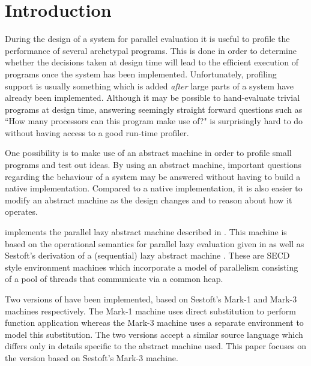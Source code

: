 \documentclass{llncs}
\begin{document}
\newcommand\blocked		{$\Box$}
\newcommand\blackhole		{$\bullet$}
\newcommand\blockedon[1]	{$\bullet \, _{#1}$}
\newcommand\bind		{$\rightarrow \:$}
\newcommand\px			{p$_x$}



\section{Introduction}
During the design of a system for parallel evaluation it is useful to profile the performance of several archetypal programs. This is done in order to determine whether the decisions taken at design time will lead to the  efficient execution of programs once the system has been implemented. Unfortunately, profiling support is usually something which is added \emph{after} large parts of a system have already been implemented. Although it may be possible to hand-evaluate trivial programs at design time, answering seemingly straight forward questions such as ``How many processors can this program make use of?" is surprisingly hard to do without having access to a good run-time profiler. \cite{loidl:thesis}

One possibility is to make use of an abstract machine in order to profile small programs and test out ideas. By using an abstract machine, important questions regarding the behaviour of a system may be answered without having to build a native implementation. Compared to a native implementation, it is also easier to modify an abstract machine as the design changes and to reason about how it operates.

\ample implements the parallel lazy abstract machine described in \cite{baker-finch:sfp99}. This machine is based on the operational semantics for parallel lazy evaluation given in \cite{baker-finch+king+trinder:icfp2000} as well as Sestoft's derivation of a (sequential) lazy abstract machine \cite{sestoft:abstractmachine}. These are SECD style environment machines which incorporate a model of parallelism consisting of a pool of threads that communicate via a common heap.

Two versions of \ample have been implemented, based on Sestoft's \mbox{Mark-1} and \mbox{Mark-3} machines respectively. The \mbox{Mark-1} machine uses direct substitution to perform function application whereas the \mbox{Mark-3} machine uses a separate environment to model this substitution. The two versions accept a similar source language which differs only in details specific to the abstract machine used. This paper focuses on the version based on Sestoft's \mbox{Mark-3} machine.
\end{document}
